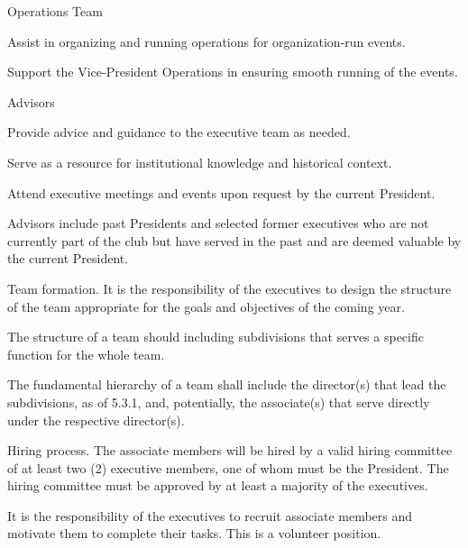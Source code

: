 \documentclass[12pt,a4paper]{article}
\begin{document}
\begin{constitutionlist}
\begin{constitutionlist}
\item Operations Team

\begin{constitutionlist}
\item Assist in organizing and running operations for organization-run events.

\item Support the Vice-President Operations in ensuring smooth running of the events.
\end{constitutionlist}

\item Advisors

\begin{constitutionlist}
\item Provide advice and guidance to the executive team as needed.

\item Serve as a resource for institutional knowledge and historical context.

\item Attend executive meetings and events upon request by the current President.

\item Advisors include past Presidents and selected former executives who are not currently part of the club but have served in the past and are deemed valuable by the current President.
\end{constitutionlist}
\end{constitutionlist}

\item Team formation. It is the responsibility of the executives to design the structure of the team appropriate for the goals and objectives of the coming year.

\begin{constitutionlist}
\item The structure of a team should including subdivisions that serves a specific function for the whole team.

\item The fundamental hierarchy of a team shall include the director(s) that lead the subdivisions, as of 5.3.1, and, potentially, the associate(s) that serve directly under the respective director(s).
\end{constitutionlist}

\item Hiring process. The associate members will be hired by a valid hiring committee of at least two (2) executive members, one of whom must be the President. The hiring committee must be approved by at least a majority of the executives.

\item It is the responsibility of the executives to recruit associate members and motivate them to complete their tasks. This is a volunteer position.
\end{constitutionlist}
\end{document}

